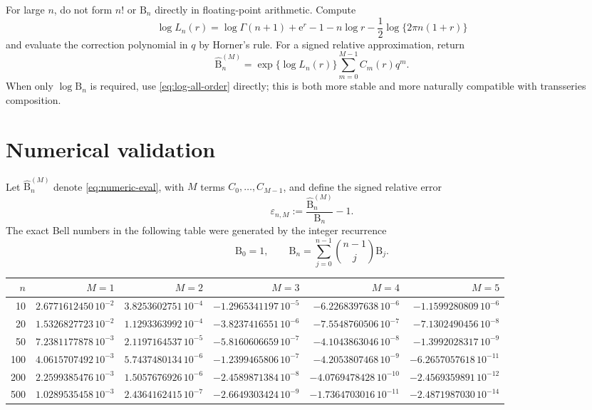 \documentclass[11pt,a4paper]{article}
\theoremstyle{definition}
\newcommand{\Bell}{\mathrm B}
\newcommand{\ee}{\mathrm e}
\begin{document}
For large $n$, do not form $n!$ or $\Bell_n$ directly in floating-point
arithmetic.  Compute
\begin{equation}\label{eq:log-prefactor}
 \log L_n(r)=\log\Gamma(n+1)+\ee^r-1-n\log r
 -\frac12\log\{2\pi n(1+r)\}
\end{equation}
and evaluate the correction polynomial in $q$ by Horner's rule.  For a signed
relative approximation, return
\begin{equation}\label{eq:numeric-eval}
 \widehat{\Bell}_n^{(M)}=
 \exp\{\log L_n(r)\}
 \sum_{m=0}^{M-1}C_m(r)q^m.
\end{equation}
When only $\log\Bell_n$ is required, use \eqref{eq:log-all-order} directly; this
is both more stable and more naturally compatible with transseries
composition.

\section{Numerical validation}

Let $\widehat{\Bell}_n^{(M)}$ denote \eqref{eq:numeric-eval}, with $M$ terms
$C_0,\ldots,C_{M-1}$, and define the signed relative error
\begin{equation}\label{eq:rel-error}
 \varepsilon_{n,M}:=\frac{\widehat{\Bell}_n^{(M)}}{\Bell_n}-1.
\end{equation}
The exact Bell numbers in the following table were generated by the integer
recurrence
\begin{equation}\label{eq:Bell-recurrence}
 \Bell_0=1,
 \qquad
 \Bell_n=\sum_{j=0}^{n-1}\binom{n-1}{j}\Bell_j.
\end{equation}

\begin{center}
\scriptsize
\setlength{\tabcolsep}{4.2pt}
\begin{tabular}{@{}r r r r r r@{}}
\toprule
$n$ & $M=1$ & $M=2$ & $M=3$ & $M=4$ & $M=5$\\
\midrule
10
& $ 2.6771612450\,10^{-2}$
& $ 3.8253602751\,10^{-4}$
& $-1.2965341197\,10^{-5}$
& $-6.2268397638\,10^{-6}$
& $-1.1599280809\,10^{-6}$\\
20
& $ 1.5326827723\,10^{-2}$
& $ 1.1293363992\,10^{-4}$
& $-3.8237416551\,10^{-6}$
& $-7.5548760506\,10^{-7}$
& $-7.1302490456\,10^{-8}$\\
50
& $ 7.2381177878\,10^{-3}$
& $ 2.1197164537\,10^{-5}$
& $-5.8160606659\,10^{-7}$
& $-4.1043863046\,10^{-8}$
& $-1.3992028317\,10^{-9}$\\
100
& $ 4.0615707492\,10^{-3}$
& $ 5.7437480134\,10^{-6}$
& $-1.2399465806\,10^{-7}$
& $-4.2053807468\,10^{-9}$
& $-6.2657057618\,10^{-11}$\\
200
& $ 2.2599385476\,10^{-3}$
& $ 1.5057676926\,10^{-6}$
& $-2.4589871384\,10^{-8}$
& $-4.0769478428\,10^{-10}$
& $-2.4569359891\,10^{-12}$\\
500
& $ 1.0289535458\,10^{-3}$
& $ 2.4364162415\,10^{-7}$
& $-2.6649303424\,10^{-9}$
& $-1.7364703016\,10^{-11}$
& $-2.4871987030\,10^{-14}$\\
\bottomrule
\end{tabular}
\end{center}
\end{document}
